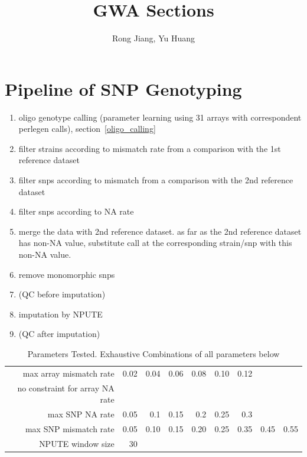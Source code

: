\documentclass[a4paper,10pt]{article}
\title{GWA Sections}
\author{Rong Jiang, Yu Huang}
\begin{document}
\maketitle

\begin{abstract}

\end{abstract}

\tableofcontents

\section{Pipeline of SNP Genotyping}
\begin{enumerate}
 \item oligo genotype calling (parameter learning using 31 arrays with correspondent perlegen calls), section~\ref{oligo_calling}
 \item filter strains according to mismatch rate from a comparison with the 1st reference dataset
 \item filter snps according to mismatch from a comparison with the 2nd reference dataset
 \item filter snps according to NA rate
 \item merge the data with 2nd reference dataset. as far as the 2nd reference dataset has non-NA value,  substitute call at the corresponding strain/snp with this non-NA value.
 \item remove monomorphic snps
 \item (QC before imputation)
 \item imputation by NPUTE
 \item (QC after imputation)
\end{enumerate}
\begin{table}
\caption{Parameters Tested. Exhaustive Combinations of all parameters below}
\begin{tabular}{|r|r|r|r|r|r|r|r|r|}
\hline
max array mismatch rate & 0.02 & 0.04 & 0.06 & 0.08 & 0.10 & 0.12 \\
no constraint for array NA rate & & & & & \\

max SNP NA rate & 0.05 & 0.1 & 0.15 & 0.2 & 0.25 & 0.3 \\

max SNP mismatch rate & 0.05 & 0.10 & 0.15 & 0.20 & 0.25 & 0.35 & 0.45 & 0.55 \\

NPUTE window size & 30 \\
\hline
\end{tabular}
\end{table}
\end{document}
